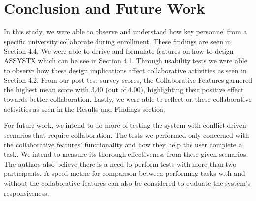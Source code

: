 \section{Conclusion and Future Work}
In this study, we were able to observe and understand how key personnel from a specific university collaborate during enrollment. These findings are seen in Section 4.4. We were able to derive and formulate features on how to design ASSYSTX which can be see in Section 4.1.  Through usability tests we were able to observe how these design implications affect collaborative activities as seen in Section 4.2. From our post-test survey scores, the Collaborative Features garnered the highest mean score with 3.40 (out of 4.00), highlighting their positive effect towards better collaboration. Lastly, we were able to reflect on these collaborative activities as seen in the Results and Findings section.


For future work, we intend to do more of testing the system with conflict-driven scenarios that require collaboration. The tests we performed only concerned with the collaborative features' functionality and how they help the user complete a task. We intend to measure its thorough effectiveness from these given scenarios. The authors also believe there is a need to perform tests with more than two participants. A speed metric for comparison between performing tasks with and without the collaborative features can also be considered to evaluate the system's responsiveness. 

